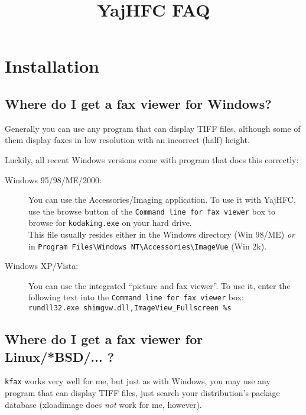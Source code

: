 \documentclass[a4paper,10pt]{scrartcl}
\title{YajHFC FAQ}
\author{}
\date{}
\begin{document}
\sloppy

\maketitle

\tableofcontents

\section{Installation}
\subsection{Where do I get a fax viewer for Windows?}

Generally you can use any program that can display TIFF files, although 
some of them display faxes in low resolution with an incorrect (half) height.

Luckily, all recent Windows versions come with program that does this correctly:

\begin{description}
\item[Windows 95/98/ME/2000:]
 You can use the Accessories/Imaging application.
      To use it with YajHFC, use the browse button of the \texttt{Command line for fax viewer}
      box to browse for \texttt{kodakimg.exe} on your hard drive.\\
      This file usually resides either in the Windows directory (Win 98/ME) \emph{or} \\
      in \verb.Program Files\Windows NT\Accessories\ImageVue. (Win 2k).
       
\item[Windows XP/Vista:]
You can use the integrated ``picture and fax viewer''.
      To use it, enter the following text into the \texttt{Command line for fax viewer} box:\\
      \verb#rundll32.exe shimgvw.dll,ImageView_Fullscreen %s#
 \end{description}

      
\subsection{Where do I get a fax viewer for Linux/*BSD/... ?}
\texttt{kfax} works very well for me, but just as with Windows, you may use any program that 
can display TIFF files, just search your distribution's package database 
(xloadimage does \emph{not} work for me, however).
\end{document}
